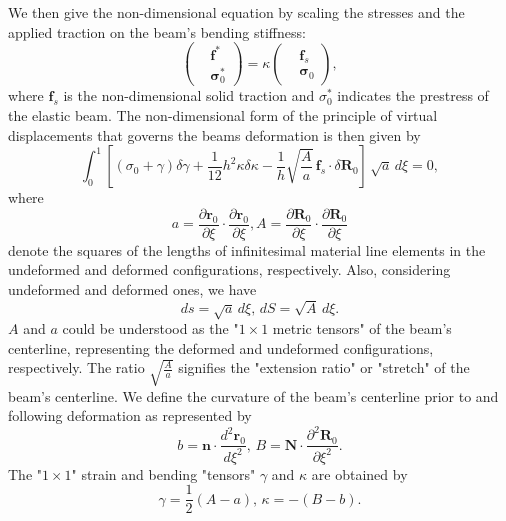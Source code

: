 \documentclass[a4paper,12pt]{report}
\begin{document}
We then give the non-dimensional equation by scaling the stresses and the applied traction on the beam's bending stiffness:
\begin{equation}
	\label{eqn:30}
	\left(\begin{aligned}
		&\mathbf{f^*} \\
		&\mathbf{\sigma}_0^*
	\end{aligned}\right)
	=\kappa\left(\begin{aligned}
		&\textbf{f}_{s} \\
		&\mathbf{\sigma}_0
	\end{aligned}\right),
\end{equation}
where $\textbf{f}_{s}$ is the non-dimensional solid traction and $\sigma^*_0$ indicates the prestress of the elastic beam.
The non-dimensional form of the principle of virtual displacements that governs the beams deformation is then given by
\begin{equation}
	\label{eqn:31}
	\int^1_0 \left[(\sigma_0+\gamma)\delta\gamma+\frac{1}{12}h^2\kappa\delta\kappa-\frac{1}{h}\sqrt{\frac{A}{a}}\,\textbf{f}_{s}\cdot \delta \textbf{R}_0
	\right]\,\sqrt{a}\,d\xi=0,
\end{equation}
where 
\begin{equation}
	\label{eqn:32} a=\frac{\partial\textbf{r}_0}{\partial\xi}\cdot\frac{\partial\textbf{r}_0}{\partial\xi}, A=\frac{\partial\textbf{R}_0}{\partial\xi}\cdot\frac{\partial\textbf{R}_0}{\partial\xi}
\end{equation}
denote the squares of the lengths of infinitesimal material line elements in the undeformed and deformed configurations, respectively.
Also, considering undeformed and deformed ones, we have 
\begin{equation}
	\label{eqn:33}
	ds=\sqrt{a}\,d\xi,\,dS=\sqrt{A}\,d\xi.
\end{equation}
$A$ and $a$ could be understood as the "$1\times1$ metric tensors" of the beam's centerline, representing the deformed and undeformed configurations, respectively. 
The ratio $\sqrt{\frac{A}{a}}$ signifies the "extension ratio" or "stretch" of the beam's centerline. We define the curvature of the beam's centerline prior to and following deformation as represented by 
\begin{equation}
	\label{eqn:34}
	b=\textbf{n}\cdot\frac{d^2\textbf{r}_0}{d\xi^2},\,B=\textbf{N}\cdot\frac{\partial^2\textbf{R}_0}{\partial\xi^2}.
\end{equation}
The "$1\times1$" strain and bending "tensors" $\gamma$ and $\kappa$ are obtained by
\begin{equation}
	\label{eqn:35}
	\gamma=\frac{1}{2}(A-a),\,\kappa=-(B-b).
\end{equation}
\end{document}
